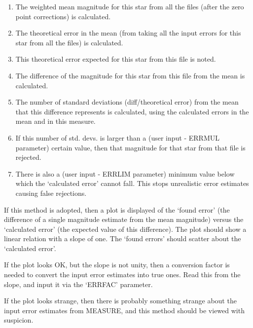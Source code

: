 \begin{small}
{{{               \begin{enumerate}
               \item The weighted mean magnitude for this star from all
                  the files (after the zero point corrections) is
                  calculated.
               \item The theoretical error in the mean (from taking all
                  the input errors for this star from all the files) is
                  calculated.
               \item This theoretical error expected for this star from
                  this file is noted.
               \item The difference of the magnitude for this star from
                  this file from the mean is calculated.
               \item  The number of standard deviations (diff/theoretical
                  error) from the mean that this difference represents
                  is calculated, using the calculated errors in the
                  mean and in this measure.
               \item If this number of std. devs. is larger than a (user
                  input - ERRMUL parameter) certain value, then that
                  magnitude for that
                  star from that file is rejected.
               \item There is also a (user input - ERRLIM parameter)
                  minimum value below which the `calculated error'
                  cannot fall. This stops unrealistic error estimates
                  causing false rejections.
               \end{enumerate}

               If this method is adopted, then a plot is
               displayed of the `found error' (the difference of a
               single magnitude estimate from the mean magnitude)
               versus the `calculated error' (the expected value of
               this difference). The plot should show a linear
               relation with a slope of one. The `found errors' should
               scatter about the `calculated error'.

               If the plot looks OK, but the slope is not unity, then
               a conversion factor is needed to convert the input
               error estimates into true ones. Read this from the slope,
               and input it via the `ERRFAC' parameter.

               If the plot looks strange, then there is probably
               something strange about the input error estimates from
               MEASURE, and this method should be viewed with suspicion.

}}}
\end{small}
